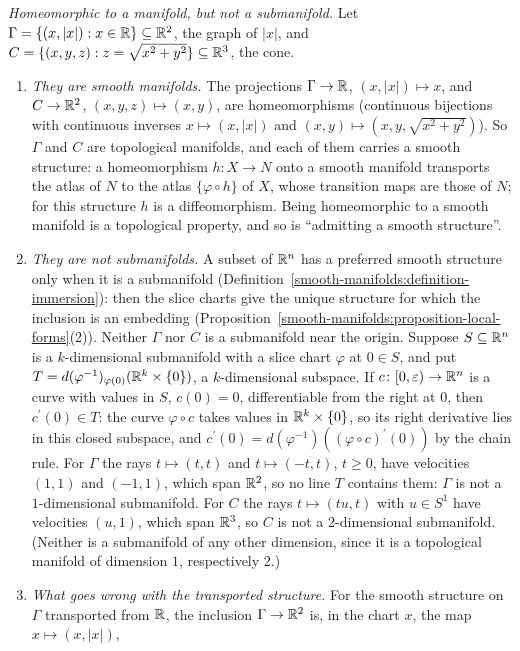 \begin{example}\label{smooth-manifolds:example-not-submanifold}
\emph{Homeomorphic to a manifold, but not a submanifold.} Let $\Gamma = \{(x, |x|) : x \in \mathbb{R}\} \subseteq \mathbb{R}^2$, the graph of $|x|$, and $C = \{(x, y, z) : z = \sqrt{x^2 + y^2}\} \subseteq \mathbb{R}^3$, the cone.
\begin{enumerate}
\item \emph{They are smooth manifolds.} The projections $\Gamma \to \mathbb{R}$, $(x, |x|) \mapsto x$, and $C \to \mathbb{R}^2$, $(x, y, z) \mapsto (x, y)$, are homeomorphisms (continuous bijections with continuous inverses
$x \mapsto (x, |x|)$ and $(x, y) \mapsto (x, y, \sqrt{x^2 + y^2})$). So $\Gamma$ and $C$ are topological manifolds, and each of them carries a smooth structure: a homeomorphism $h \colon X \to N$ onto a
smooth manifold transports the atlas of $N$ to the atlas $\{\varphi \circ h\}$ of $X$, whose transition maps are those of $N$; for this structure $h$ is a diffeomorphism. Being homeomorphic to a smooth
manifold is a topological property, and so is ``admitting a smooth structure''.
\item \emph{They are not submanifolds.} A subset of $\mathbb{R}^n$ has a preferred smooth structure only when it is a submanifold (Definition~\ref{smooth-manifolds:definition-immersion}): then the slice charts give
the unique structure for which the inclusion is an embedding (Proposition~\ref{smooth-manifolds:proposition-local-forms}(2)). Neither $\Gamma$ nor $C$ is a submanifold near the origin. Suppose $S \subseteq \mathbb{R}^n$ is a
$k$-dimensional submanifold with a slice chart $\varphi$ at $0 \in S$, and put $T = d(\varphi^{-1})_{\varphi(0)}(\mathbb{R}^k \times \{0\})$, a $k$-dimensional subspace. If $c \colon [0, \varepsilon) \to \mathbb{R}^n$ is a curve
with values in $S$, $c(0) = 0$, differentiable from the right at $0$, then $c^{\prime}(0) \in T$: the curve $\varphi \circ c$ takes values in $\mathbb{R}^k \times \{0\}$, so its right derivative lies in this closed
subspace, and $c^{\prime}(0) = d(\varphi^{-1})((\varphi \circ c)^{\prime}(0))$ by the chain rule. For $\Gamma$ the rays $t \mapsto (t, t)$ and $t \mapsto (-t, t)$, $t \geq 0$, have velocities $(1, 1)$ and
$(-1, 1)$, which span $\mathbb{R}^2$, so no line $T$ contains them: $\Gamma$ is not a $1$-dimensional submanifold. For $C$ the rays $t \mapsto (tu, t)$ with $u \in S^1$ have velocities $(u, 1)$, which span
$\mathbb{R}^3$, so $C$ is not a $2$-dimensional submanifold. (Neither is a submanifold of any other dimension, since it is a topological manifold of dimension $1$, respectively $2$.)
\item \emph{What goes wrong with the transported structure.} For the smooth structure on $\Gamma$ transported from $\mathbb{R}$, the inclusion $\Gamma \to \mathbb{R}^2$ is, in the chart $x$, the map $x \mapsto (x, |x|)$,

\end{enumerate}
\end{example}
